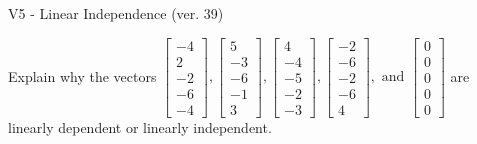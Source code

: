 \begin{exercise}
  \begin{exerciseTitle}V5 - Linear Independence (ver. 39)\end{exerciseTitle}
  \begin{exerciseStatement}
    Explain why the vectors \(\left[\begin{array}{r}
-4 \\
2 \\
-2 \\
-6 \\
-4
\end{array}\right] , \left[\begin{array}{r}
5 \\
-3 \\
-6 \\
-1 \\
3
\end{array}\right] , \left[\begin{array}{r}
4 \\
-4 \\
-5 \\
-2 \\
-3
\end{array}\right] , \left[\begin{array}{r}
-2 \\
-6 \\
-2 \\
-6 \\
4
\end{array}\right] , \text{ and } \left[\begin{array}{r}
0 \\
0 \\
0 \\
0 \\
0
\end{array}\right]\) are linearly dependent or linearly independent.	



\end{exerciseStatement}
\end{exercise}
